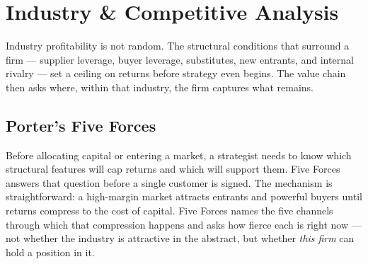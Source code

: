 \chapter{Industry \& Competitive Analysis}\label{ch:competitive-analysis}


Industry profitability is not random. The structural conditions that surround a firm
--- supplier leverage, buyer leverage, substitutes, new entrants, and internal rivalry ---
set a ceiling on returns before strategy even begins. The value chain then asks where,
within that industry, the firm captures what remains.

\section{Porter's Five Forces}\label{sec:five-forces}

Before allocating capital or entering a market, a strategist needs to know which structural
features will cap returns and which will support them. Five Forces answers that question before
a single customer is signed. The mechanism is straightforward: a high-margin market attracts
entrants and powerful buyers until returns compress to the cost of capital. Five Forces names
the five channels through which that compression happens and asks how fierce each is right now
--- not whether the industry is attractive in the abstract, but whether \emph{this firm} can
hold a position in it.

